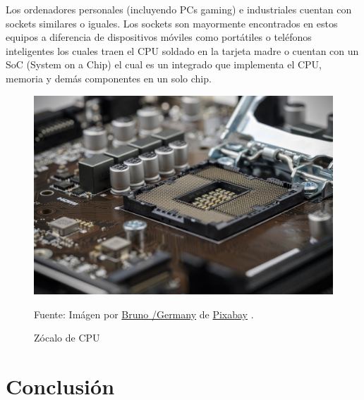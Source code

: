 \documentclass[conference]{IEEEtran}
\begin{document}
Los ordenadores personales (incluyendo PCs gaming) e industriales cuentan con sockets similares o iguales. Los sockets son mayormente encontrados en estos equipos a diferencia de dispositivos móviles como portátiles o teléfonos inteligentes los cuales traen el CPU soldado en la tarjeta madre o cuentan con un SoC (System on a Chip) el cual es un integrado que implementa el CPU, memoria y demás componentes en un solo chip.

\begin{figure}[H]
    \centering
    \includegraphics[width=0.3\paperwidth]{images/cpu-socket.jpg}
    \caption{Zócalo de CPU} \footnotesize
    Fuente: Imágen por \href{https://pixabay.com/users/bru-no-1161770}{Bruno /Germany} de \href{https://pixabay.com}{Pixabay} \cite{pixabay-cpu-socket-2019}.
\end{figure}

\section{Conclusión}

\printbibliography
\end{document}

